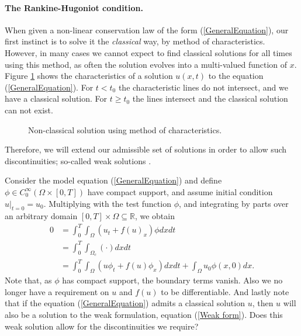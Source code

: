 \documentclass[10pt]{article}
\numberwithin{equation}{section}
\begin{document}
\paragraph{The Rankine-Hugoniot condition.}
When given a non-linear conservation law of the form (\ref{GeneralEquation}), our first instinct is to solve it the \textit{classical} way, by method of characteristics. However, in many cases we cannot expect to find classical solutions for all times using this method, as often the solution evolves into a multi-valued function of $x$. Figure \ref{Fig:Multivalued} shows the characteristics of a solution $u(x,t)$ to the equation (\ref{GeneralEquation}). For $t < t_0$ the characteristic lines do not intersect, and we have a classical solution. For $t \geq t_0$ the lines intersect and the classical solution can not exist. 
\begin{figure}
\begin{center}

\caption{Non-classical solution using method of characteristics.}
\label{Fig:Multivalued}
\end{center}
\end{figure}
Therefore, we will extend our admissible set of solutions in order to allow such discontinuities; so-called weak solutions \cite{HoldenH.Helge2015Ftfh}. 

Consider the model equation (\ref{GeneralEquation}) and define $\phi \in C_0^{\infty}(\Omega \times [0, T])$ have compact support, and assume initial condition $u|_{t=0} = u_0 $. Multiplying with the test function $\phi$, and integrating by parts over an arbitrary domain $[0,T] \times \Omega \subseteq \mathbb{R}$, we obtain
\begin{align}
    0 &= \int_0^T \int_{\Omega} (u_t + f(u)_x)\phi dxdt \nonumber \\
      &= \int_0^T \int_{\Omega_c} (\cdot) dxdt \nonumber \\ 
      &= \int_0^T \int_{\Omega} (u \phi_t + f(u)\phi_x) dxdt + \int_{\Omega} u_0 \phi(x,0) dx. 
    \label{Weak form}
\end{align}
Note that, as $\phi$ has compact support, the boundary terms vanish. Also we no longer have a requirement on $u$ and $f(u)$ to be differentiable. And lastly note that if the equation (\ref{GeneralEquation}) admits a classical solution $u$, then $u$ will also be a solution to the weak formulation, equation (\ref{Weak form}). Does this weak solution allow for the discontinuities we require?
\end{document}
